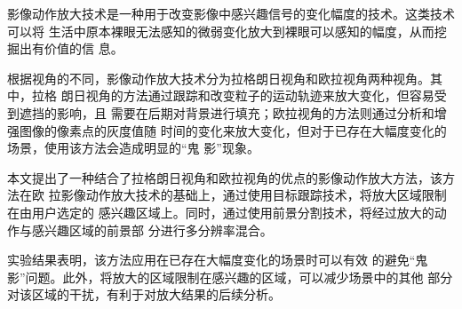 \begin{cabstract}
  影像动作放大技术是一种用于改变影像中感兴趣信号的变化幅度的技术。这类技术可以将
  生活中原本裸眼无法感知的微弱变化放大到裸眼可以感知的幅度，从而挖掘出有价值的信
  息。

  根据视角的不同，影像动作放大技术分为拉格朗日视角和欧拉视角两种视角。其中，拉格
  朗日视角的方法通过跟踪和改变粒子的运动轨迹来放大变化，但容易受到遮挡的影响，且
  需要在后期对背景进行填充；欧拉视角的方法则通过分析和增强图像的像素点的灰度值随
  时间的变化来放大变化，但对于已存在大幅度变化的场景，使用该方法会造成明显的“鬼
  影”现象。

  本文提出了一种结合了拉格朗日视角和欧拉视角的优点的影像动作放大方法，该方法在欧
  拉影像动作放大技术的基础上，通过使用目标跟踪技术，将放大区域限制在由用户选定的
  感兴趣区域上。同时，通过使用前景分割技术，将经过放大的动作与感兴趣区域的前景部
  分进行多分辨率混合。

  实验结果表明，该方法应用在已存在大幅度变化的场景时可以有效
  的避免“鬼影”问题。此外，将放大的区域限制在感兴趣的区域，可以减少场景中的其他
  部分对该区域的干扰，有利于对放大结果的后续分析。
  
\end{cabstract}

